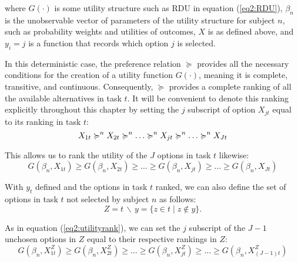 \documentclass[../main.tex]{subfiles}
\begin{document}
\noindent where $G(\cdot)$ is some utility structure such as RDU in equation (\ref{eq2:RDU}), $\beta_n$ is the unobservable vector of parameters of the utility structure for subject $n$, such as probability weights and utilities of outcomes, $X$ is as defined above, and $y_i=j$ is a function that records which option $j$ is selected.

In this deterministic case, the preference relation $\succcurlyeq$ provides all the necessary conditions for the creation of a utility function $G(\cdot)$, meaning it is complete, transitive, and continuous.
Consequently, $\succcurlyeq$ provides a complete ranking of all the available alternatives in task $t$.
It will be convenient to denote this ranking explicitly throughout this chapter by setting the $j$ subscript of option $X_{jt}$ equal to its ranking in task $t$:
\begin{equation}
	\label{eq2:outcomerank}
	X_{1t} \succcurlyeq^n X_{2t} \succcurlyeq^n \ldots \succcurlyeq^n X_{jt} \succcurlyeq^n \ldots \succcurlyeq^n X_{Jt}\\
\end{equation}

\noindent This allows us to rank the utility of the $J$ options in task $t$ likewise:
\begin{equation}
	\label{eq2:utilityrank}
	G(\beta_n,X_{1t}) \geq G(\beta_n,X_{2t}) \geq \ldots \geq G(\beta_n,X_{jt}) \geq \ldots \geq G(\beta_n,X_{Jt})
\end{equation}

\noindent With $y_t$ defined and the options in task $t$ ranked, we can also define the set of options in task $t$ not selected by subject $n$ as follows:
\begin{equation}
	\label{eq2:emptyset}
	Z = t \,\backslash\, y = \{z \in t \;|\; z \notin y \}.
\end{equation}

As in equation (\ref{eq2:utilityrank}), we can set the $j$ subscript of the $J-1$ unchosen options in $Z$ equal to their respective rankings in $Z$:
\begin{equation}
	\label{eq2:Zutilityrank}
	G(\beta_n,X_{1t}^Z) \geq G(\beta_n,X_{2t}^Z) \geq \ldots \geq G(\beta_n,X_{jt}^Z) \geq \ldots \geq G(\beta_n,X_{(J-1)t}^Z)
\end{equation}
\end{document}
